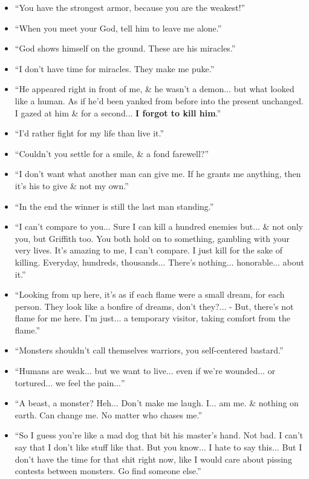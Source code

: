 \documentclass{article}
\begin{document}
\begin{enumerate}
\begin{itemize}
    	\item ``You have the strongest armor, because you are the weakest!''
    	\item ``When you meet your God, tell him to leave me alone.''
    	\item ``God shows himself on the ground. These are his miracles.''
    	\item ``I don't have time for miracles. They make me puke.''
    	\item ``He appeared right in front of me, \& he wasn't a demon$\ldots$ but what looked like a human. As if he'd been yanked from before into the present unchanged. I gazed at him \& for a second$\ldots$ {\bf I forgot to kill him}.''
    	\item ``I'd rather fight for my life than live it.''
    	\item ``Couldn't you settle for a smile, \& a fond farewell?''
    	\item ``I don't want what another man can give me. If he grants me anything, then it's his to give \& not my own.''
    	\item ``In the end the winner is still the last man standing.''
    	\item ``I can't compare to you$\ldots$ Sure I can kill a hundred enemies but$\ldots$ \& not only you, but Griffith too. You both hold on to something, gambling with your very lives. It's amazing to me, I can't compare. I just kill for the sake of killing. Everyday, hundreds, thousands$\ldots$ There's nothing$\ldots$ honorable$\ldots$ about it.''
    	\item ``Looking from up here, it's as if each flame were a small dream, for each person. They look like a bonfire of dreams, don't they?$\ldots$ - But, there's not flame for me here. I'm just$\ldots$ a temporary visitor, taking comfort from the flame.''
    	\item ``Monsters shouldn't call themselves warriors, you self-centered bastard.''
    	\item ``Humans are weak$\ldots$ but we want to live$\ldots$ even if we're wounded$\ldots$ or tortured$\ldots$ we feel the pain$\ldots$''
    	\item ``A beast, a monster? Heh$\ldots$ Don't make me laugh. I$\ldots$ am me. \& nothing on earth. Can change me. No matter who chases me.''
    	\item ``So I guess you're like a mad dog that bit his master's hand. Not bad. I can't say that I don't like stuff like that. But you know$\ldots$ I hate to say this$\ldots$ But I don't have the time for that shit right now, like I would care about pissing contests between monsters. Go find someone else.''

\end{itemize}
\end{enumerate}
\end{document}
